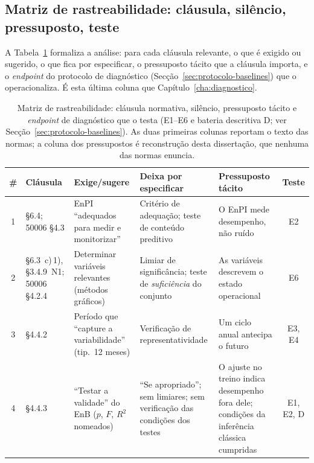 \subsection{Matriz de rastreabilidade: cláusula, silêncio, pressuposto, teste}
\label{sec:assimetria-matriz}

A Tabela~\ref{tab:matriz-rastreabilidade} formaliza a análise: para cada cláusula relevante, o que é exigido ou sugerido, o que fica por especificar, o pressuposto tácito que a cláusula importa, e o \emph{endpoint} do protocolo de diagnóstico (Secção~\ref{sec:protocolo-baselines}) que o operacionaliza. É esta última coluna que  Capítulo~\ref{cha:diagnostico}.

\begin{table}[htbp]
  \centering\footnotesize
  \caption[Matriz de rastreabilidade cláusula--silêncio--pressuposto--teste]{Matriz de rastreabilidade: cláusula normativa, silêncio, pressuposto tácito
  e \emph{endpoint} de diagnóstico que o testa (E1--E6 e bateria descritiva D;
  ver Secção~\ref{sec:protocolo-baselines}). As duas primeiras colunas
  reportam o texto das normas; a coluna dos pressupostos é reconstrução desta
  dissertação, que nenhuma das normas enuncia.}
  \label{tab:matriz-rastreabilidade}
  \ntzebra
  \begin{tabularx}{\textwidth}{@{}c >{\raggedright\arraybackslash}p{2.1cm} X X X c@{}}
    \toprule
    \# & \textbf{Cláusula} & \textbf{Exige/sugere} & \textbf{Deixa por especificar} & \textbf{Pressuposto tácito} & \textbf{Teste} \\
    \midrule
    1 & 50001 \S6.4; 50006 \S4.3 & EnPI \enquote{adequados para medir e monitorizar} & Critério de adequação; teste de conteúdo preditivo & O EnPI mede desempenho, não ruído & E2 \\
    2 & 50001 \S6.3~c)\,1), \S3.4.9~N1; 50006 \S4.2.4 & Determinar variáveis relevantes (métodos gráficos) & Limiar de significância; teste de \emph{suficiência} do conjunto & As variáveis descrevem o estado operacional & E6 \\
    3 & 50006 \S4.4.2 & Período que \enquote{capture a variabilidade} (tip.\ 12 meses) & Verificação de representatividade & Um ciclo anual antecipa o futuro & E3, E4 \\
    4 & 50006 \S4.4.3 & \enquote{Testar a validade} do EnB ($p$, $F$, $R^2$ nomeados) & \enquote{Se apropriado}; sem limiares; sem verificação das condições dos testes & O ajuste no treino indica desempenho fora dele; condições da inferência clássica cumpridas & E1, E2, D \\

\end{tabularx}
\end{table}
